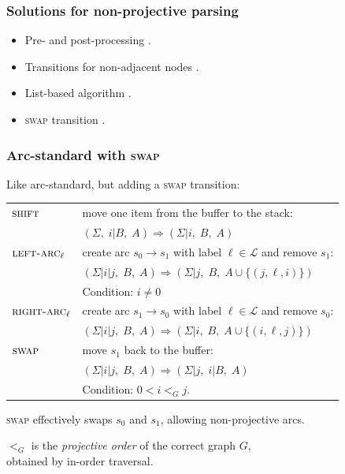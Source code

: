 \documentclass[t]{beamer}
\begin{document}
\begin{frame}
    \frametitle{Solutions for non-projective parsing}
    \begin{itemize}
    \item Pre- and post-processing \cite{nivre2005pseudo}.
    \item Transitions for non-adjacent nodes \cite{attardi2006experiments}.
    \item List-based algorithm \cite{nivre2008algorithms}.
    \item {\textsc{swap} transition \cite{nivre2009non}.}
    \end{itemize}
\end{frame}

\begin{frame}
  \frametitle{Arc-standard with \textsc{swap} \cite{nivre2009non}}
  Like arc-standard, but adding a \textsc{swap} transition:

  \begin{tabular}{ll}
    $\textsc{shift}$ & move one item from the buffer to the stack: \\
    & $(\Sigma, \; i | B, \; A) \Rightarrow (\Sigma | i, \; B, \; A)$ \\
    \hline
    $\textsc{left-arc}_\ell$ & create arc $s_0 \to s_1$ with label $\ell \in \mathcal{L}$ and remove $s_1$: \\
    & $(\Sigma | i|j, \; B, \; A) \Rightarrow (\Sigma | j, \; B, \; A \cup \{(j,\ell,i)\})$ \\
    & Condition: $i\neq0$ \\
    \hline
    $\textsc{right-arc}_\ell$ & create arc $s_1 \to s_0$ with label $\ell \in \mathcal{L}$ and remove $s_0$: \\
    & $(\Sigma | i|j, \; B, \; A) \Rightarrow (\Sigma | i, \; B, \; A \cup \{(i,\ell,j)\})$ \\
    \hline
    $\textsc{swap}$ & move $s_1$ back to the buffer: \\
    & $(\Sigma | i|j, \; B, \; A) \Rightarrow (\Sigma | j, \; i | B, \; A)$ \\
    & Condition: $0<i<_Gj$.
  \end{tabular}
  
  \pause\vfill
  
  \textsc{swap} effectively swaps $s_0$ and $s_1$, allowing non-projective arcs.
    
    \pause\vfill
    
    $<_G$ is the \textit{projective order} of the correct graph $G$, \\
    obtained by in-order traversal.
\end{frame}
\end{document}

